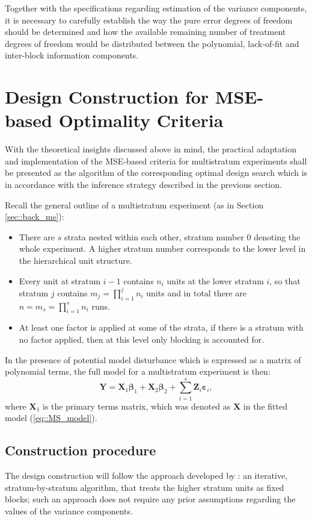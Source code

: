 Together with the specifications regarding estimation of the variance components, it is necessary to carefully establish the way the pure error degrees of freedom should be determined and how the available remaining number of treatment degrees of freedom would be distributed between the polynomial, lack-of-fit and inter-block information components. 

\section{Design Construction for MSE-based Optimality Criteria}
\label{sec::ch7_search}
With the theoretical insights discussed above in mind, the practical adaptation and implementation of the MSE-based criteria for multistratum experiments shall be presented as the algorithm of the corresponding optimal design search which is in accordance with the inference strategy described in the previous section.

Recall the general outline of a multistratum experiment (as in Section \ref{sec::back_ms}): 
\begin{itemize}
\item There are $s$ strata nested within each other, stratum number $0$ denoting the whole experiment. A higher stratum number corresponds to the lower level in the hierarchical unit structure.
\item Every unit at stratum $i-1$ contains $n_i$ units at the lower stratum $i$, so that stratum $j$ contains $m_j=\prod_{i=1}^{j}n_{i}$ units and in total there are $n=m_{s}=\prod_{i=1}^{s}n_{i}$ runs. 
\item At least one factor is applied at some of the strata, if there is a stratum with no factor applied, then at this level only blocking is accounted for.
\end{itemize}

In the presence of potential model disturbance which is expressed as a matrix of polynomial terms, the full model for a multistratum experiment is then:
\begin{equation}
\label{eq::MS_model_full}
\bm{Y}=\bm{X}_1\bm{\beta}_1+\bm{X}_2\bm{\beta}_2+\sum_{i=1}^{s}\bm{Z}_{i}\bm{\varepsilon}_{i},
\end{equation}
where $\bm{X}_1$ is the primary terms matrix, which was denoted as $\bm{X}$ in the fitted model (\ref{eq::MS_model}). 

\subsection{Construction procedure}
The design construction will follow the approach developed by \cite{Trinca2015improved}: an iterative, stratum-by-stratum algorithm, that treats the higher stratum units as fixed blocks; such an approach does not require any prior assumptions regarding the values of the variance components. 

